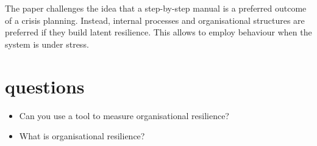 The paper challenges the idea that a step-by-step manual is a preferred outcome of a crisis planning. 
Instead, internal processes and organisational structures are preferred if they build latent resilience. 
This allows to employ behaviour when the system is under stress.

\section{questions}
\begin{itemize}
  \item Can you use a tool to measure organisational resilience?
  \item What is organisational resilience?
\end{itemize}
